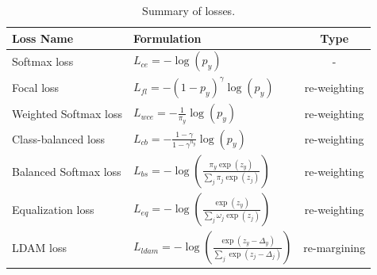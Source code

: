 \begin{table}[H]
    \centering
    \caption{Summary of losses.}
    \label{tab:loss_summary}
    \begin{tabular}{|l|l|c|}
    \hline
    \textbf{Loss Name}       & \textbf{Formulation}                                                & \textbf{Type}        \\ \hline
    Softmax loss \cite{pytorch_crossentropy}             & $L_{ce} = - \log(p_y)$                                              & -                   \\
    Focal loss \cite{lin2018focallossdenseobject}     & $L_{fl} = -(1 - p_y)^\gamma \log(p_y)$                             & re-weighting        \\
    Weighted Softmax loss \cite{zhang2023deep}    & $L_{wce} = - \frac{1}{\pi_y} \log(p_y)$                           & re-weighting        \\
    Class-balanced loss \cite{cui2019classbalancedlossbasedeffective} & $L_{cb} = - \frac{1 - \gamma}{1 - \gamma^{n_y}} \log(p_y)$         & re-weighting        \\
    Balanced Softmax loss \cite{ren2020balancedmetasoftmaxlongtailedvisual} & $L_{bs} = - \log\left( \frac{\pi_y \exp(z_y)}{\sum_j \pi_j \exp(z_j)} \right)$ & re-weighting        \\
    Equalization loss \cite{tan2020equalizationlosslongtailedobject} & $L_{eq} = - \log\left( \frac{\exp(z_y)}{\sum_j \omega_j \exp(z_j)} \right)$    & re-weighting        \\
    LDAM loss \cite{cao2019learningimbalanceddatasetslabeldistributionaware}      & $L_{ldam} = - \log\left( \frac{\exp(z_y - \Delta_y)}{\sum_j \exp(z_j - \Delta_j)} \right)$ & re-margining        \\
    \hline
    \end{tabular}
    \end{table}


